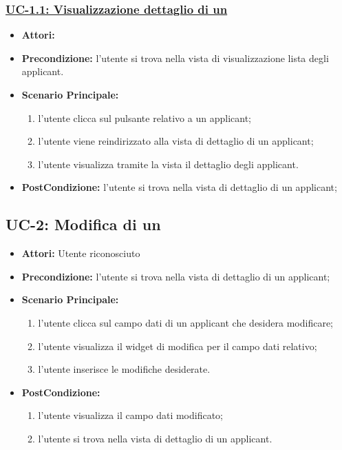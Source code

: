 \subsubsection{\underline{UC-1.1: Visualizzazione dettaglio di un\applicant}}
\begin{itemize}
	\item \textbf{Attori:}\loggedusr
	\item \textbf{Precondizione:} l'utente si trova nella vista di visualizzazione lista degli applicant. 
	\item \textbf{Scenario Principale:}
	\begin{enumerate}
		\item l'utente clicca sul pulsante relativo a un applicant;
		\item l'utente viene reindirizzato alla vista di dettaglio di un applicant;
		\item l'utente visualizza tramite la vista il dettaglio degli applicant.
	\end{enumerate}
	\item \textbf{PostCondizione:} l'utente si trova nella vista di dettaglio di un applicant;
\end{itemize}


\subsection{UC-2: Modifica di un \applicant}
\begin{itemize}
	\item \textbf{Attori:} Utente riconosciuto
	\item \textbf{Precondizione:}  l'utente si trova nella vista di dettaglio di un applicant;
	\item \textbf{Scenario Principale:}
	\begin{enumerate}
		\item l'utente clicca sul campo dati di un applicant che desidera modificare;
		\item l'utente visualizza il  widget di modifica per il campo dati
		relativo;
		\item l'utente inserisce le modifiche desiderate.
	\end{enumerate}
	\item \textbf{PostCondizione:} 
	\begin{enumerate}
		\item l'utente visualizza il campo dati modificato;
		\item l'utente si trova nella vista di dettaglio di un applicant.
	\end{enumerate}
	
\end{itemize}

